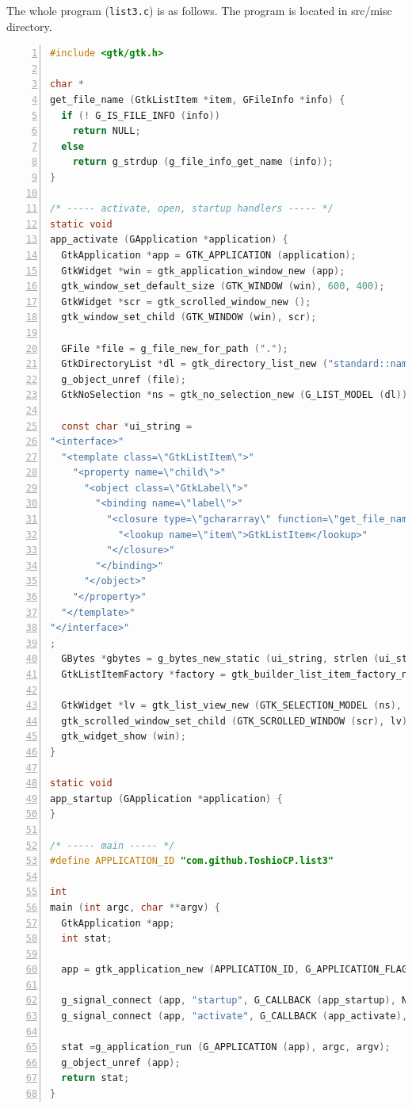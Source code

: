 The whole program (\passthrough{\lstinline!list3.c!}) is as follows. The
program is located in src/misc directory.

\begin{lstlisting}[language=C, numbers=left]
#include <gtk/gtk.h>

char *
get_file_name (GtkListItem *item, GFileInfo *info) {
  if (! G_IS_FILE_INFO (info))
    return NULL;
  else
    return g_strdup (g_file_info_get_name (info));
}

/* ----- activate, open, startup handlers ----- */
static void
app_activate (GApplication *application) {
  GtkApplication *app = GTK_APPLICATION (application);
  GtkWidget *win = gtk_application_window_new (app);
  gtk_window_set_default_size (GTK_WINDOW (win), 600, 400);
  GtkWidget *scr = gtk_scrolled_window_new ();
  gtk_window_set_child (GTK_WINDOW (win), scr);

  GFile *file = g_file_new_for_path (".");
  GtkDirectoryList *dl = gtk_directory_list_new ("standard::name", file);
  g_object_unref (file);
  GtkNoSelection *ns = gtk_no_selection_new (G_LIST_MODEL (dl));

  const char *ui_string =
"<interface>"
  "<template class=\"GtkListItem\">"
    "<property name=\"child\">"
      "<object class=\"GtkLabel\">"
        "<binding name=\"label\">"
          "<closure type=\"gchararray\" function=\"get_file_name\">"
            "<lookup name=\"item\">GtkListItem</lookup>"
          "</closure>"
        "</binding>"
      "</object>"
    "</property>"
  "</template>"
"</interface>"
;
  GBytes *gbytes = g_bytes_new_static (ui_string, strlen (ui_string));
  GtkListItemFactory *factory = gtk_builder_list_item_factory_new_from_bytes (NULL, gbytes);

  GtkWidget *lv = gtk_list_view_new (GTK_SELECTION_MODEL (ns), factory);
  gtk_scrolled_window_set_child (GTK_SCROLLED_WINDOW (scr), lv);
  gtk_widget_show (win);
}

static void
app_startup (GApplication *application) {
}

/* ----- main ----- */
#define APPLICATION_ID "com.github.ToshioCP.list3"

int
main (int argc, char **argv) {
  GtkApplication *app;
  int stat;

  app = gtk_application_new (APPLICATION_ID, G_APPLICATION_FLAGS_NONE);

  g_signal_connect (app, "startup", G_CALLBACK (app_startup), NULL);
  g_signal_connect (app, "activate", G_CALLBACK (app_activate), NULL);

  stat =g_application_run (G_APPLICATION (app), argc, argv);
  g_object_unref (app);
  return stat;
}
\end{lstlisting}

